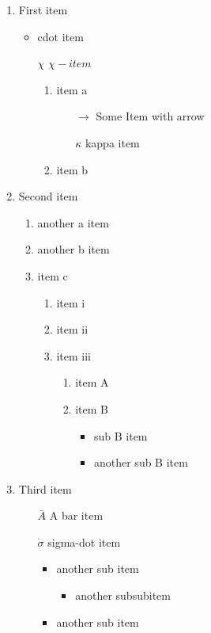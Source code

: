 \documentclass[a4paper, 12pt]{article}
\begin{document}
\begin{enumerate}
    \item First item
    \begin{itemize}
    \item cdot item
    \item[$\chi$] $\chi-item$
        \begin{enumerate}
            \item item a
            \begin{itemize}
                \item[$\longrightarrow$] Some Item with arrow
                \item[$\kappa$] kappa item
            \end{itemize}
            \item item b
        \end{enumerate}
    \end{itemize}
    \item Second item
    \begin{enumerate}
        \item another a item 
        \item another b item 
        \item item c
        \begin{enumerate}
            \item item i 
            \item item ii
            \item item iii
            \begin{enumerate}
                \item item A
                \item item B
                \begin{itemize}
                    \item sub B item
                    \item another sub B item 
                \end{itemize}
            \end{enumerate}
        \end{enumerate}
    \end{enumerate}
    \item Third item
    \begin{itemize}
        \item[$	\bar{A}$] A bar item
        \item [$\dot{\sigma}$] sigma-dot item 
        \begin{itemize}
            \item another sub item 
            \begin{itemize}
                \item another subsubitem
            \end{itemize}
            \item another sub item 
        \end{itemize}
    \end{itemize}
\end{enumerate}
\newpage
\end{document}
